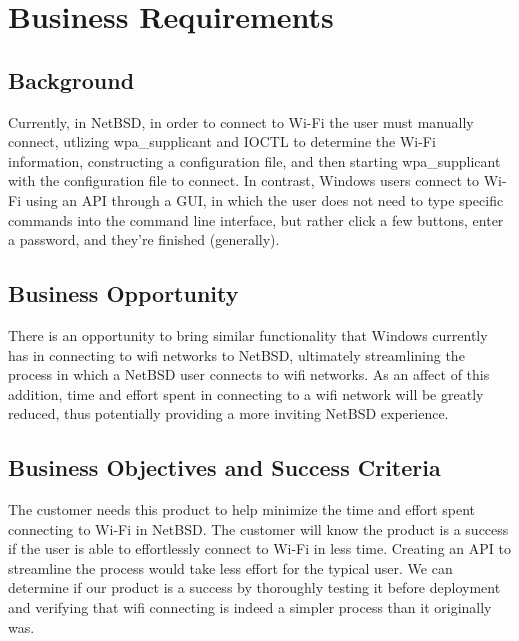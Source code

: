 \section{Business Requirements}
\subsection{Background}

Currently, in NetBSD, in order to connect to Wi-Fi the user must manually connect, utlizing wpa\_supplicant and IOCTL to determine the Wi-Fi information, constructing a configuration file, and then starting wpa\_supplicant with the configuration file to connect.
In contrast, Windows users connect to Wi-Fi using an API through a GUI, in which the user does not need to type specific commands into the command line interface, but rather click a few buttons, enter a password, and they're finished (generally). 

\subsection{Business Opportunity}

There is an opportunity to bring similar functionality that Windows currently has in connecting to wifi networks to NetBSD, ultimately streamlining the process in which a NetBSD user connects to wifi networks. As an affect of this addition, time and effort spent in connecting to a wifi network will be greatly reduced, thus potentially providing a more inviting NetBSD experience.

\subsection{Business Objectives and Success Criteria}

The customer needs this product to help minimize the time and effort spent connecting to Wi-Fi in NetBSD. The customer will know the product is a success if 
the user is able to effortlessly connect to Wi-Fi in less time. Creating an API to streamline the process would take less effort for the typical user. 
We can determine if our product is a success by thoroughly testing it before deployment and verifying that wifi connecting is indeed a simpler process than it originally was.

